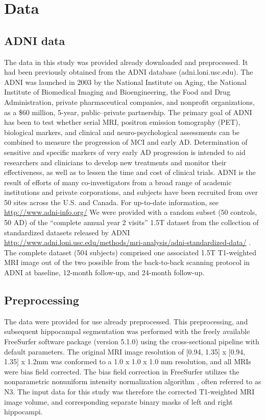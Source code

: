 \chapter{Data}
\section{ADNI data}
The data in this study was provided already downloaded and preprocessed. It had been previously obtained from the ADNI database (adni.loni.usc.edu). The ADNI was launched in 2003 by the National Institute on Aging, the National Institute of Biomedical Imaging and Bioengineering, the Food and Drug Administration, private pharmaceutical companies, and nonprofit organizations, as a \$60 million, 5-year, public–private partnership. The primary goal of ADNI has been to test whether serial MRI, positron emission tomography (PET), biological markers, and clinical and neuro-psychological assessments can be combined to measure the progression of MCI and early AD. Determination of sensitive and specific markers of very early AD progression is intended to aid researchers and clinicians to develop new treatments and monitor their effectiveness, as well as to lessen the time and cost of clinical trials. ADNI is the result of efforts of many co-investigators from a broad range of academic institutions and private corporations, and subjects have been recruited from over 50 sites across the U.S. and Canada. For up-to-date information, see \href{http://www.adni-info.org/}{http://www.adni-info.org/}
We were provided with a random subset (50 controls, 50 AD) of the “complete annual year 2 visits” 1.5T dataset from the collection of standardized datasets released by ADNI \href{http://www.adni.loni.usc.edu/methods/mri-analysis/adni-standardized-data/}{http://www.adni.loni.usc.edu/methods/mri-analysis/adni-standardized-data/} \cite{wyman2013standardization}. The complete dataset (504 subjects) comprised one associated 1.5T T1-weighted MRI image out of the two possible from the back-to-back scanning protocol in ADNI \cite{jack2008alzheimer} at baseline, 12-month follow-up, and 24-month follow-up.

\section{Preprocessing}
The data were provided for use already preprocessed. This preprocessing, and subsequent hippocampal segmentation was performed with the freely available FreeSurfer software package (version 5.1.0) \cite{fischl2002whole} using the cross-sectional pipeline with default parameters. The original MRI image resolution of [0.94, 1.35] x [0.94, 1.35] x 1.2mm was conformed to a 1.0 x 1.0 x 1.0 mm resolution, and all MRIs were bias field corrected. The bias field correction in FreeSurfer utilizes the nonparametric nonuniform intensity normalization algorithm \cite{sled1998nonparametric}, often referred to as N3. The input data for this study was therefore the corrected T1-weighted MRI image volume, and corresponding separate binary masks of left and right hippocampi.